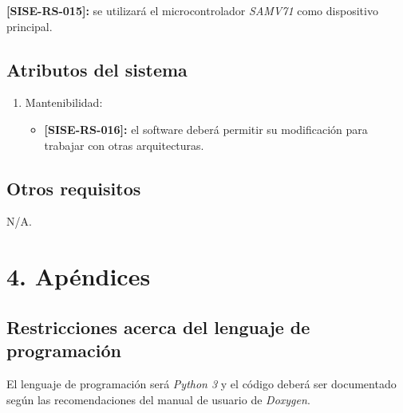 \documentclass[
11pt, %
codirector, %
]{charter}
\def\codigo{SISE-RS}
\newcommand{\req}[1]{\textbf{[\codigo-#1]:}}
\begin{document}
\req{015} se utilizará el microcontrolador \emph{SAMV71} como dispositivo principal.

\subsection{Atributos del sistema}
\label{sub:atributos}

\begin{enumerate}
	\item Mantenibilidad:
	\begin{itemize}
		\item \req{016} el software deberá permitir su modificación para trabajar con otras arquitecturas.
	\end{itemize}
\end{enumerate}

\subsection{Otros requisitos}
\label{sub:otros}

N/A.

\section{4. Apéndices}
\label{sec:apendices}



\subsection{Restricciones acerca del lenguaje de programación}

El lenguaje de programación será \emph{Python 3} y el código deberá ser documentado según las recomendaciones del manual de usuario de \emph{Doxygen}.
\end{document}
